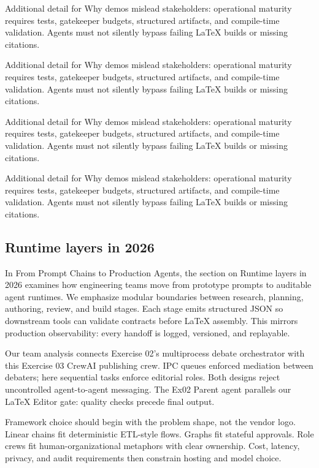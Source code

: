 Additional detail for Why demos mislead stakeholders: operational maturity requires tests, gatekeeper budgets, structured artifacts, and compile-time validation. Agents must not silently bypass failing LaTeX builds or missing citations. \cite{crewai2024} \cite{langgraph2024} \cite{mcp2024}

Additional detail for Why demos mislead stakeholders: operational maturity requires tests, gatekeeper budgets, structured artifacts, and compile-time validation. Agents must not silently bypass failing LaTeX builds or missing citations. \cite{crewai2024} \cite{langgraph2024} \cite{mcp2024}

Additional detail for Why demos mislead stakeholders: operational maturity requires tests, gatekeeper budgets, structured artifacts, and compile-time validation. Agents must not silently bypass failing LaTeX builds or missing citations. \cite{crewai2024} \cite{langgraph2024} \cite{mcp2024}

Additional detail for Why demos mislead stakeholders: operational maturity requires tests, gatekeeper budgets, structured artifacts, and compile-time validation. Agents must not silently bypass failing LaTeX builds or missing citations. \cite{crewai2024} \cite{langgraph2024} \cite{mcp2024}

\subsection{Runtime layers in 2026}
In From Prompt Chains to Production Agents, the section on Runtime layers in 2026 examines how engineering teams move from prototype prompts to auditable agent runtimes. We emphasize modular boundaries between research, planning, authoring, review, and build stages. Each stage emits structured JSON so downstream tools can validate contracts before LaTeX assembly. This mirrors production observability: every handoff is logged, versioned, and replayable. \cite{crewai2024} \cite{langgraph2024} \cite{mcp2024}

Our team analysis connects Exercise 02's multiprocess debate orchestrator with this Exercise 03 CrewAI publishing crew. IPC queues enforced mediation between debaters; here sequential tasks enforce editorial roles. Both designs reject uncontrolled agent-to-agent messaging. The Ex02 Parent agent parallels our LaTeX Editor gate: quality checks precede final output. \cite{crewai2024} \cite{langgraph2024} \cite{mcp2024}

Framework choice should begin with the problem shape, not the vendor logo. Linear chains fit deterministic ETL-style flows. Graphs fit stateful approvals. Role crews fit human-organizational metaphors with clear ownership. Cost, latency, privacy, and audit requirements then constrain hosting and model choice. \cite{crewai2024} \cite{langgraph2024} \cite{mcp2024}

